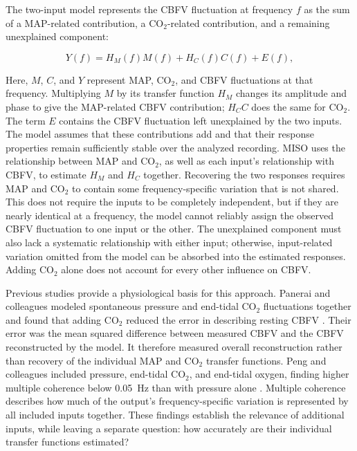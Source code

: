 \documentclass[12pt]{article}
\begin{document}
The two-input model represents the CBFV fluctuation at frequency $f$ as the
sum of a MAP-related contribution, a CO$_2$-related contribution, and a
remaining unexplained component:

\begin{equation}
    Y(f) = H_M(f)M(f) + H_C(f)C(f) + E(f),
    \label{eq:conceptual_generator}
\end{equation}

Here, $M$, $C$, and $Y$ represent MAP, CO$_2$, and CBFV fluctuations at that
frequency. Multiplying $M$ by its transfer function $H_M$ changes its amplitude
and phase to give the MAP-related CBFV contribution; $H_C C$ does the same for
CO$_2$. The term $E$ contains the CBFV fluctuation left unexplained by the two
inputs. The model assumes that these contributions add and that their response
properties remain sufficiently stable over the analyzed recording. MISO uses
the relationship between MAP and CO$_2$, as well as each input's relationship
with CBFV, to estimate $H_M$ and $H_C$ together. Recovering the two responses
requires MAP and CO$_2$ to contain some frequency-specific variation that is
not shared. This does not require the inputs to be completely independent, but
if they are nearly identical at a frequency, the model cannot reliably assign
the observed CBFV fluctuation to one input or the other. The unexplained
component must also lack a systematic relationship with either input;
otherwise, input-related variation omitted from the model can be absorbed into
the estimated responses. Adding CO$_2$ alone does not account for every other
influence on CBFV.

Previous studies provide a physiological basis for this approach. Panerai and
colleagues modeled spontaneous pressure and end-tidal CO$_2$ fluctuations
together and found that adding CO$_2$ reduced the error in describing resting
CBFV \cite{Panerai2000}. Their error was the mean squared difference between
measured CBFV and the CBFV reconstructed by the model. It therefore measured
overall reconstruction rather than recovery of the individual MAP and CO$_2$
transfer functions. Peng and colleagues included pressure, end-tidal
CO$_2$, and end-tidal oxygen, finding higher multiple coherence below 0.05~Hz
than with pressure alone \cite{Peng2008}. Multiple coherence describes how
much of the output's frequency-specific variation is represented by all
included inputs together. These findings establish the relevance of additional
inputs, while leaving a separate question: how accurately are their individual
transfer functions estimated?
\end{document}
